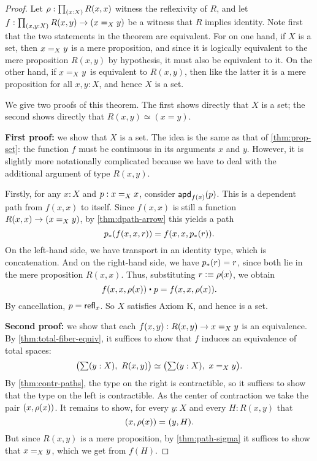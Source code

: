 \begin{proof}
  Let $\rho : \prd{x:X} R(x,x)$ witness the reflexivity of $R$, and let $f : \prd{x,y:X} R(x,y) \to (\id[X]{x}{y})$ be a witness that $R$
implies identity.
  Note first that the two statements in the theorem are equivalent.
  For on one hand, if $X$ is a set, then $\id[X]xy$ is a mere proposition, and since it is logically equivalent to the mere proposition
$R(x,y)$ by hypothesis, it must also be equivalent to it.
  On the other hand, if $\id[X]xy$ is equivalent to $R(x,y)$, then like the latter it is a mere proposition for all $x,y:X$, and hence $X$
is a set.

  We give two proofs of this theorem.
  The first shows directly that $X$ is a set; the second shows directly that $R(x,y)\simeq (x=y)$.

  \textbf{First proof:} we show that $X$ is a set.
  The idea is the same as that of \autoref{thm:prop-set}: the function $f$ must be continuous in its arguments $x$ and $y$.
  However, it is slightly more notationally complicated because we have to deal with the additional argument of type $R(x,y)$.

  Firstly, for any $x:X$ and $p:\id[X]xx$, consider $\apdfunc{f(x)}(p)$.
  This is a dependent path from $f(x,x)$ to itself.
  Since $f(x,x)$ is still a function $R(x,x) \to (\id[X]xy)$, by \autoref{thm:dpath-arrow} this yields a path
  \[\trans{p}{f(x,x,r)} = f(x,x,\trans{p}r).
  \]
  On the left-hand side, we have transport in an identity type, which is concatenation.
  And on the right-hand side, we have $\trans{p}r = r$, since both lie in the mere proposition $R(x,x)$.
  Thus, substituting $r\defeq \rho(x)$, we obtain
  \[ f(x,x,\rho(x)) \ct p = f(x,x,\rho(x)). \]
  By cancellation, $p=\refl{x}$.
  So $X$ satisfies Axiom K, and hence is a set.

  \textbf{Second proof:} we show that each $f(x,y) : R(x,y) \to \id[X]{x}{y}$ is an equivalence.
  By \autoref{thm:total-fiber-equiv}, it suffices to show that $f$ induces an equivalence of total spaces:
  \begin{equation*}
    \eqv{\big(\sm{y:X}R(x,y)\big)}{\big(\sm{y:X}\id[X]{x}{y}\big)}.
  \end{equation*}
  By \autoref{thm:contr-paths}, the type on the right is contractible, so it
  suffices to show that the type on the left is contractible. As the center of
  contraction we take the pair $\pairr{x,\rho(x)}$.  It remains to show, for
  every ${y:X}$ and every ${H:R(x,y)}$ that
  \begin{equation*}
    \id{\pairr{x,\rho(x)}}{\pairr{y,H}}.
  \end{equation*}
  But since $R(x,y)$ is a mere proposition, by \autoref{thm:path-sigma} it suffices to show that
  $\id[X]{x}{y}$, which we get from $f(H)$.
\end{proof}

